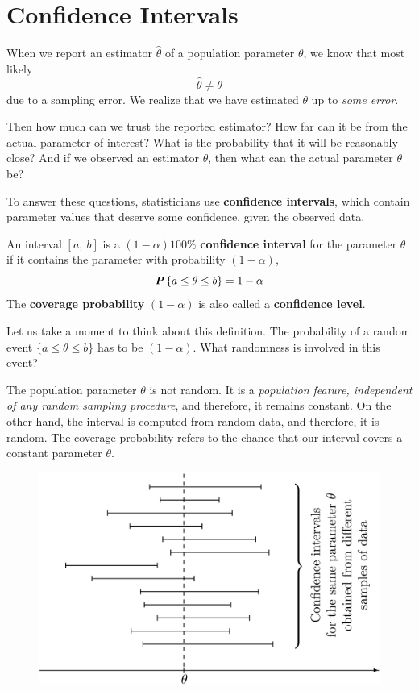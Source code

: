 \section{Confidence Intervals}
\label{sec:confidence-intervals}

When we report an estimator $\hat{\theta}$ of a population parameter $\theta$, we know that most likely
\begin{equation*}
  \hat{\theta} \neq \theta
\end{equation*}
due to a sampling error. We realize that we have estimated $\theta$ up to \textit{some error}.

Then how much can we trust the reported estimator? How far can it be from the actual parameter of interest? What is the probability that it will be reasonably close? And if we observed an estimator $\hat{\theta}$, then what can the actual parameter $\theta$ be?

To answer these questions, statisticians use \textbf{confidence intervals}, which contain parameter values that deserve some confidence, given the observed data.
\begin{definition}{}
  An interval $\left[ a,\ b \right]$ is a $(1 - \alpha)100\%$ \textbf{confidence interval} for the parameter $\theta$ if it contains the parameter with probability $(1 - \alpha)$,
  \begin{equation*}
    \textbf{\textit{P}}\left\{a \leq \theta \leq b\right\} = 1 - \alpha
  \end{equation*}
  The \textbf{coverage probability} $(1 - \alpha)$ is also called a \textbf{confidence level}.
\end{definition}

Let us take a moment to think about this definition. The probability of a random event $\{ a \leq \theta \leq b \}$ has to be $(1 - \alpha)$. What randomness is involved in this event?

The population parameter $\theta$ is not random. It is a \textit{population feature, independent of any random sampling procedure}, and therefore, it remains constant. On the other hand, the interval is computed from random data, and therefore, it is random. The coverage probability refers to the chance that our interval covers a constant parameter $\theta$.

\begin{figure}[H]
  \centering
  \includegraphics[width=\linewidth]{img/fig-9.2.png}
  \caption{}
  \label{fig:9.2}
\end{figure}

